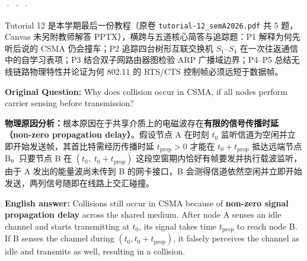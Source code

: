 

 ·  ·  · 


Tutorial 12 是本学期最后一份教程（原卷 \texttt{tutorial-12\_semA2026.pdf} 共 5 题，Canvas 未另附教师解答 PPTX），横跨与五道核心简答与追踪题：P1 解释为何先听后说的 CSMA 仍会撞车；P2 追踪四台树形互联交换机 $S_1\text{–}S_4$ 在一次往返通信中的自学习表项；P3 结合双子网路由器图检验 ARP 广播域边界；P4–P5 总结无线链路物理特性并论证为何 802.11 的 RTS/CTS 控制帧必须远短于数据帧。



\textbf{Original Question:} Why does collision occur in CSMA, if all nodes perform carrier sensing before transmission?

\textbf{物理原因分析：}根本原因在于共享介质上的电磁波存在\textbf{有限的信号传播时延（non-zero propagation delay）}。假设节点 A 在时刻 $t_0$ 监听信道为空闲并立即开始发送帧，其首比特需经历传播时延 $t_{\mathrm{prop}} > 0$ 才能在 $t_0 + t_{\mathrm{prop}}$ 抵达远端节点 B。只要节点 B 在 $(t_0,\; t_0 + t_{\mathrm{prop}})$ 这段空窗期内恰好有帧要发并执行载波监听，由于 A 发出的能量波尚未传到 B 的网卡接口，B 会测得信道依然空闲并立即开始发送，两列信号随即在线路上交汇碰撞。

\textbf{English answer:} Collisions still occur in CSMA because of \textbf{non-zero signal propagation delay} across the shared medium. After node A senses an idle channel and starts transmitting at $t_0$, its signal takes time $t_{\mathrm{prop}}$ to reach node B. If B senses the channel during $(t_0, t_0 + t_{\mathrm{prop}})$, it falsely perceives the channel as idle and transmits as well, resulting in a collision.



